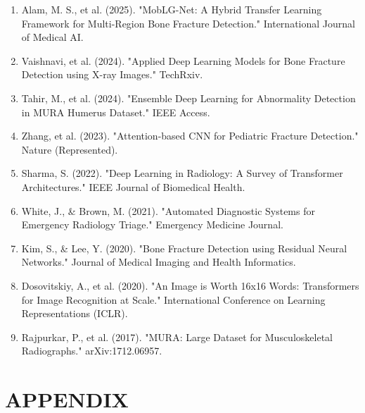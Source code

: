 \documentclass[a4paper,12pt]{report}
\begin{document}
    \begin{enumerate}
        \item Alam, M. S., et al. (2025). "MobLG-Net: A Hybrid Transfer Learning Framework for Multi-Region Bone Fracture Detection." International Journal of Medical AI.
        \item Vaishnavi, et al. (2024). "Applied Deep Learning Models for Bone Fracture Detection using X-ray Images." TechRxiv.
        \item Tahir, M., et al. (2024). "Ensemble Deep Learning for Abnormality Detection in MURA Humerus Dataset." IEEE Access.
        \item Zhang, et al. (2023). "Attention-based CNN for Pediatric Fracture Detection." Nature (Represented).
        \item Sharma, S. (2022). "Deep Learning in Radiology: A Survey of Transformer Architectures." IEEE Journal of Biomedical Health.
        \item White, J., \& Brown, M. (2021). "Automated Diagnostic Systems for Emergency Radiology Triage." Emergency Medicine Journal.
        \item Kim, S., \& Lee, Y. (2020). "Bone Fracture Detection using Residual Neural Networks." Journal of Medical Imaging and Health Informatics.
        \item Dosovitskiy, A., et al. (2020). "An Image is Worth 16x16 Words: Transformers for Image Recognition at Scale." International Conference on Learning Representations (ICLR).
        \item Rajpurkar, P., et al. (2017). "MURA: Large Dataset for Musculoskeletal Radiographs." arXiv:1712.06957.
    \end{enumerate}





    \chapter*{APPENDIX}
\end{document}
